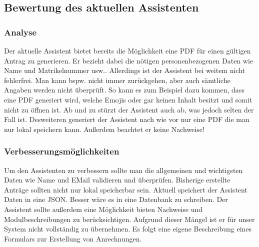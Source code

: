 \subsection{Bewertung des aktuellen Assistenten}

\subsubsection{Analyse}
Der aktuelle Assistent bietet bereits die Möglichkeit eine PDF für einen gültigen Antrag zu generieren. Er bezieht dabei die nötigen personenbezogenen Daten wie Name und Matrikelnummer usw.. Allerdings ist der Assistent bei weitem nicht fehlerfrei. Man kann bspw. nicht immer zurückgehen, aber auch sämtliche Angaben werden nicht überprüft. So kann es zum Beispiel dazu kommen, dass eine PDF generiert wird, welche Emojis oder gar keinen Inhalt besitzt und somit nicht zu öffnen ist. Ab und zu stürzt der Assistent auch ab, was jedoch selten der Fall ist.
Desweiteren generiert der Assistent nach wie vor nur eine PDF die man nur lokal speichern kann. Außerdem beachtet er keine Nachweise!

\subsubsection{Verbesserungsmöglichkeiten}
Um den Assistenten zu verbessern sollte man die allgemeinen und wichtigsten Daten wie Name und EMail validieren und überprüfen. Bisherige erstellte Anträge sollten nicht nur lokal speicherbar sein. Aktuell speichert der Assistent Daten in eine JSON. Besser wäre es in eine Datenbank zu schreiben. Der Assistent sollte außerdem eine Möglichkeit bieten Nachweise und Modulbeschreibungen zu berücksichtigen.
Aufgrund dieser Mängel ist er für unser System nicht vollständig zu übernehmen. Es folgt eine eigene Beschreibung eines Formulars zur Erstellung von Anrechnungen.

